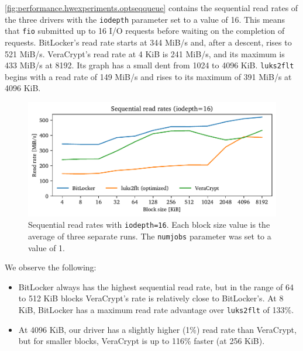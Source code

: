 \autoref{fig:performance.hwexperiments.optseqqueue} contains the sequential read rates of the three drivers with the \texttt{iodepth} parameter set to a value of 16. This means that \texttt{fio} submitted up to 16 I/O requests before waiting on the completion of requests. BitLocker's read rate starts at 344 MiB/s and, after a descent, rises to 521 MiB/s. VeraCrypt's read rate at 4 KiB is 241 MiB/s, and its maximum is 433 MiB/s at 8192. Its graph has a small dent from 1024 to 4096 KiB. \texttt{luks2flt} begins with a read rate of 149 MiB/s and rises to its maximum of 391 MiB/s at 4096 KiB.

\begin{figure}[htb!]
	\center
	\includegraphics[scale=1]{../fig/performance.hwexperiments.optseqqueue.pdf}
	\caption[
		Sequential read rates with \texttt{iodepth=16}
	]{
		Sequential read rates with \texttt{iodepth=16}. Each block size value is the average of three separate runs. The \texttt{numjobs} parameter was set to a value of 1.
	}
	\label{fig:performance.hwexperiments.optseqqueue}
\end{figure}

We observe the following:
\begin{itemize}[beginpenalty=10000]
	\item BitLocker always has the highest sequential read rate, but in the range of 64 to 512 KiB blocks VeraCrypt's rate is relatively close to BitLocker's. At 8 KiB, BitLocker has a maximum read rate advantage over \texttt{luks2flt} of 133\%.
	\item At 4096 KiB, our driver has a slightly higher (1\%) read rate than VeraCrypt, but for smaller blocks, VeraCrypt is up to 116\% faster (at 256 KiB).
\end{itemize}

